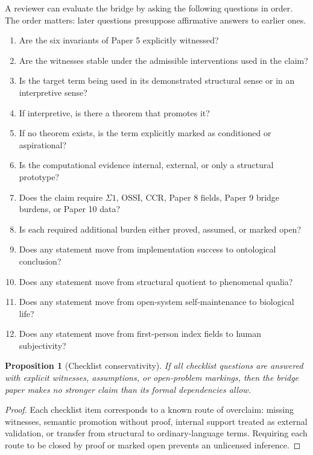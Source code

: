 \documentclass[11pt,a4paper]{article}
\newtheorem{proposition}[theorem]{Proposition}
\theoremstyle{definition}
\begin{document}
A reviewer can evaluate the bridge by asking the following questions in order.
The order matters: later questions presuppose affirmative answers to earlier
ones.

\begin{enumerate}[leftmargin=1.5em]
\item Are the six invariants of Paper 5 explicitly witnessed?
\item Are the witnesses stable under the admissible interventions used in the
claim?
\item Is the target term being used in its demonstrated structural sense or in
an interpretive sense?
\item If interpretive, is there a theorem that promotes it?
\item If no theorem exists, is the term explicitly marked as conditioned or
aspirational?
\item Is the computational evidence internal, external, or only a structural prototype?
\item Does the claim require $\Sigma1$, OSSI, CCR, Paper 8 fields, Paper 9
bridge burdens, or Paper 10 data?
\item Is each required additional burden either proved, assumed, or marked
open?
\item Does any statement move from implementation success to ontological
conclusion?
\item Does any statement move from structural quotient to phenomenal qualia?
\item Does any statement move from open-system self-maintenance to biological
life?
\item Does any statement move from first-person index fields to human
subjectivity?
\end{enumerate}

\begin{proposition}[Checklist conservativity]
If all checklist questions are answered with explicit witnesses, assumptions,
or open-problem markings, then the bridge paper makes no stronger claim than
its formal dependencies allow.
\end{proposition}

\begin{proof}
Each checklist item corresponds to a known route of overclaim: missing
witnesses, semantic promotion without proof, internal support treated as
external validation, or transfer from structural to ordinary-language terms.
Requiring each route to be closed by proof or marked open prevents an
unlicensed inference.
\end{proof}
\end{document}
